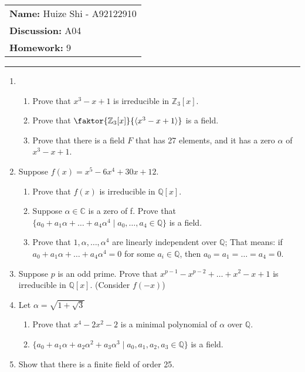 \documentclass[12pt]{article}
\begin{document}
\null\hfill\begin{tabular}[t]{l@{}}
	\textbf{Name: }Huize Shi - A92122910 \\
	\textbf{Discussion: }A04 \\
	\textbf{Homework: }9
\end{tabular}
\noindent\rule{\textwidth}{0.5pt}

\begin{enumerate}
	\item
	\begin{enumerate}
		\item Prove that $x^3 - x + 1$ is irreducible in $\mathbb{Z}_3[x]$.
		\item Prove that $\faktor{\mathbb{Z}_3[x]}{\langle x^3 - x + 1 \rangle}$ is
			a field.
		\item Prove that there is a field $F$ that has 27 elements, and it has a
			zero $\alpha$ of $x^3 - x + 1$.
	\end{enumerate}

	\item Suppose $f(x) = x^5 - 6x^4 + 30x + 12$.
		\begin{enumerate}
			\item Prove that $f(x)$ is irreducible in $\mathbb{Q}[x]$.
			\item Suppose $\alpha \in \mathbb{C}$ is a zero of f. Prove that $\{a_0 +
					a_1\alpha + \dots + a_4\alpha^4 \mid a_0,\dots,a_4 \in \mathbb{Q}\}$
					is a field.
			\item Prove that $1, \alpha,\dots,\alpha^4$ are linearly independent over
				$\mathbb{Q}$; That means: if $a_0 + a_1\alpha+\dots+a_4\alpha^4 = 0$ for
				some $a_i \in \mathbb{Q}$, then $a_0 = a_1 = \dots = a_4 = 0$.
		\end{enumerate}

	\item Suppose $p$ is an odd prime. Prove that $x^{p-1} - x^{p-2} + \dots + x^2
		- x + 1$ is irreducible in $\mathbb{Q}[x]$. (Consider $f(-x)$)
	
	\item Let $\alpha = \sqrt{1+\sqrt{3}}$
		\begin{enumerate}
			\item Prove that $x^4 - 2x^2 - 2$ is a minimal polynomial of $\alpha$ over
				$\mathbb{Q}$.
			\item $\{a_0 + a_1\alpha + a_2\alpha^2 + a_3\alpha^3 \mid a_0, a_1, a_2,
					a_3 \in \mathbb{Q}\}$ is a field.
		\end{enumerate}

	\item Show that there is a finite field of order 25.

\end{enumerate}
\end{document}
